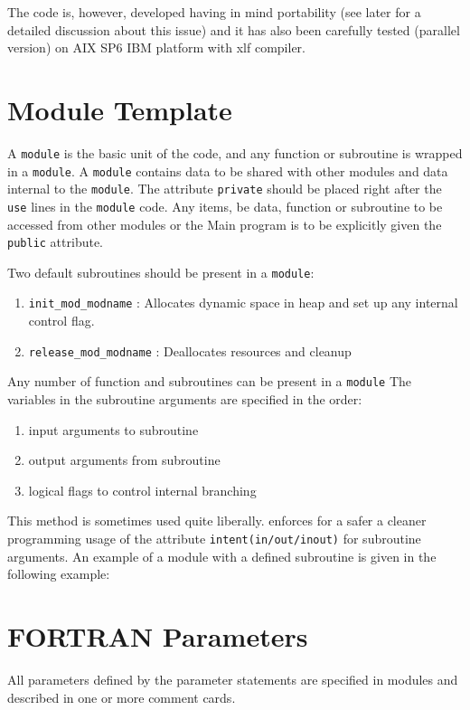 The code is, however, developed having in mind portability (see later for a detailed
discussion about this issue) and it has also been carefully tested (parallel version) on AIX SP6 IBM platform with xlf  compiler.

\section{Module Template}

A \verb=module= is the basic unit of the code, and any function or subroutine is
wrapped in a \verb=module=. A \verb=module= contains data to be shared with
other \PR modules and data internal to the \verb=module=. The \fort attribute
\verb=private= should be placed right after the \verb=use= lines in the
\verb=module= code. Any items, be data, function or subroutine to be accessed
from other modules or the Main program is to be explicitly given the 
\verb=public= attribute.

Two default subroutines should be present in a \verb=module=:

\begin{enumerate}
\item \verb=init_mod_modname= : Allocates dynamic space in heap and set up any
internal control flag.
\item \verb=release_mod_modname= : Deallocates resources and cleanup
\end{enumerate}

Any number of function and subroutines can be present in a \verb=module=
The variables in the subroutine arguments are specified in the order:

\begin{enumerate}
\item input arguments to subroutine
\item output arguments from subroutine
\item logical flags to control internal branching
\end{enumerate}

This method is sometimes used quite liberally. 
\PR enforces for a safer a cleaner programming usage of the \fort
attribute \verb=intent(in/out/inout)= for subroutine arguments.  
An example of a module with a defined subroutine is given in the following
example:



\section{FORTRAN Parameters}
All parameters defined by the \fort parameter statements are specified
in modules and described in one or more comment cards.

